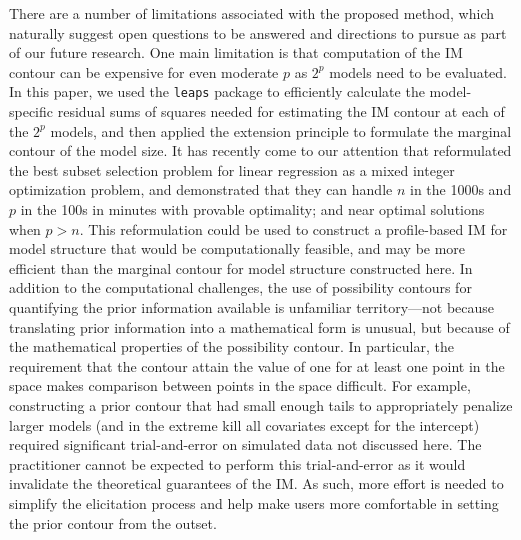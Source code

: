 \documentclass[12pt]{article}
\begin{document}
There are a number of limitations associated with the proposed method, which naturally suggest open questions to be answered and directions to pursue as part of our future research. One main limitation is that computation of the IM contour can be expensive for even moderate $p$ as $2^p$ models need to be evaluated. In this paper, we used the {\tt leaps} package to efficiently calculate the model-specific residual sums of squares needed for estimating the IM contour at each of the $2^p$ models, and then applied the extension principle to formulate the marginal contour of the model size. It has recently come to our attention that \cite{bertsimas2016best} reformulated the best subset selection problem for linear regression as a mixed integer optimization problem, and demonstrated that they can handle $n$ in the 1000s and $p$ in the 100s in minutes with provable optimality; and near optimal solutions when $p > n$. This reformulation could be used to construct a profile-based IM for model structure that would be computationally feasible, and may be more efficient than the marginal contour for model structure constructed here. 
In addition to the computational challenges, the use of possibility contours for quantifying the prior information available is unfamiliar territory---not because translating prior information into a mathematical form is unusual, but because of the mathematical properties of the possibility contour. In particular, the requirement that the contour attain the value of one for at least one point in the space makes comparison between points in the space difficult. For example, constructing a prior contour that had small enough tails to appropriately penalize larger models (and in the extreme kill all covariates except for the intercept) required significant trial-and-error on simulated data not discussed here. The practitioner cannot be expected to perform this trial-and-error as it would invalidate the theoretical guarantees of the IM. As such, more effort is needed to simplify the elicitation process and help make users more comfortable in setting the prior contour from the outset. 

\end{document}
